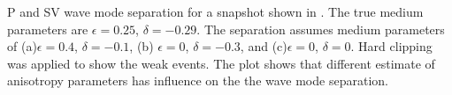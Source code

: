 {P and SV wave mode separation for a snapshot shown in
{}. The true medium parameters are $\epsilon=0.25$,
$\delta=-0.29$. The separation assumes medium parameters of
(a)$\epsilon=0.4$, $\delta=-0.1$, (b) $\epsilon=0$, $\delta=-0.3$, and
(c)$\epsilon=0$, $\delta=0$. Hard clipping was applied to show the
weak events. {The plot shows that different estimate of anisotropy
parameters has influence on the the wave mode separation.}}
